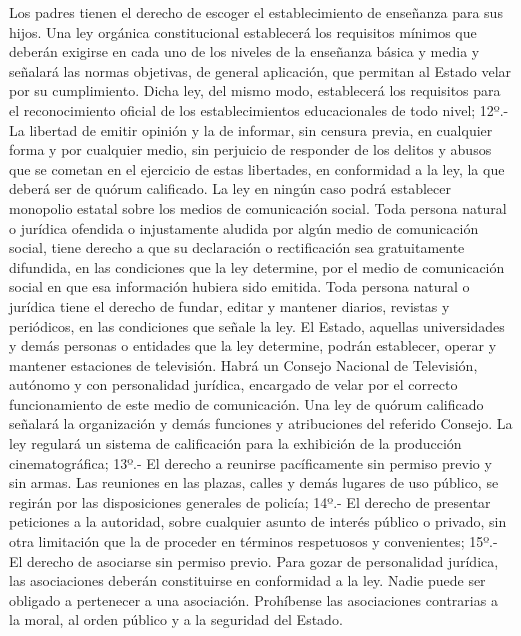     Los padres tienen el derecho de escoger el establecimiento de enseñanza para sus hijos.
    Una ley orgánica constitucional establecerá los requisitos mínimos que deberán exigirse en cada uno de los niveles de la enseñanza básica y media y señalará las normas objetivas, de general aplicación, que permitan al Estado velar por su cumplimiento. Dicha ley, del mismo modo, establecerá los requisitos para el reconocimiento oficial de los establecimientos educacionales de todo nivel;
    12º.- La libertad de emitir opinión y la de informar, sin censura previa, en cualquier forma y por cualquier medio, sin perjuicio de responder de los delitos y abusos que se cometan en el ejercicio de estas libertades, en conformidad a la ley, la que deberá ser de quórum calificado.
    La ley en ningún caso podrá establecer monopolio estatal sobre los medios de comunicación social.
    Toda persona natural o jurídica ofendida o injustamente aludida por algún medio de comunicación social, tiene derecho a que su declaración o rectificación sea gratuitamente difundida, en las condiciones que la ley determine, por el medio de comunicación social en que esa información hubiera sido emitida.
    Toda persona natural o jurídica tiene el derecho de fundar, editar y mantener diarios, revistas y periódicos, en las condiciones que señale la ley.
    El Estado, aquellas universidades y demás personas o entidades que la ley determine, podrán establecer, operar y mantener estaciones de televisión.
    Habrá un Consejo Nacional de Televisión, autónomo y con personalidad jurídica, encargado de velar por el correcto funcionamiento de este medio de comunicación. Una ley de quórum calificado señalará la organización y demás funciones y atribuciones del referido Consejo.
    La ley regulará un sistema de calificación para la exhibición de la producción cinematográfica;
    13º.- El derecho a reunirse pacíficamente sin permiso previo y sin armas.
    Las reuniones en las plazas, calles y demás lugares de uso público, se regirán por las disposiciones generales de policía;
    14º.- El derecho de presentar peticiones a la autoridad, sobre cualquier asunto de interés público o privado, sin otra limitación que la de proceder en términos respetuosos y convenientes;
    15º.- El derecho de asociarse sin permiso previo.
    Para gozar de personalidad jurídica, las asociaciones deberán constituirse en conformidad a la ley.
    Nadie puede ser obligado a pertenecer a una asociación.
    Prohíbense las asociaciones contrarias a la moral, al orden público y a la seguridad del Estado.
